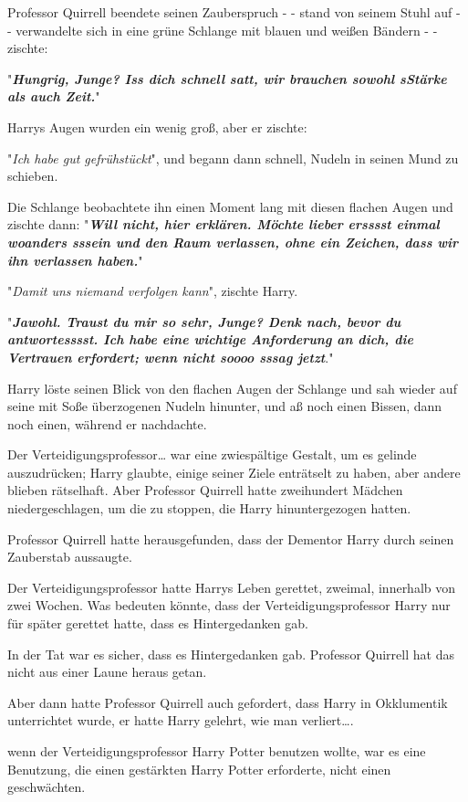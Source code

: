 {Professor Quirrell beendete seinen Zauberspruch - - stand von seinem Stuhl auf - - verwandelte sich in eine grüne Schlange mit blauen und weißen Bändern - - zischte:

"\textbf{\emph{Hungrig, Junge? Iss dich schnell satt, wir brauchen sowohl sStärke als auch Zeit.}}"

Harrys Augen wurden ein wenig groß, aber er zischte:

"\emph{Ich habe gut gefrühstückt}", und begann dann schnell, Nudeln in seinen Mund zu schieben.

Die Schlange beobachtete ihn einen Moment lang mit diesen flachen Augen und zischte dann: "\textbf{\emph{Will nicht, hier erklären. Möchte lieber ersssst einmal woanders sssein und den Raum verlassen, ohne ein Zeichen, dass wir ihn verlassen haben.}}"

"\emph{Damit uns niemand verfolgen kann}", zischte Harry.

"\textbf{\emph{Jawohl. Traust du mir so sehr, Junge? Denk nach, bevor du antwortesssst. Ich habe eine wichtige Anforderung an dich, die Vertrauen erfordert; wenn nicht soooo sssag jetzt}}."

Harry löste seinen Blick von den flachen Augen der Schlange und sah wieder auf seine mit Soße überzogenen Nudeln hinunter, und aß noch einen Bissen, dann noch einen, während er nachdachte.

Der Verteidigungsprofessor… war eine zwiespältige Gestalt, um es gelinde auszudrücken; Harry glaubte, einige seiner Ziele enträtselt zu haben, aber andere blieben rätselhaft. Aber Professor Quirrell hatte zweihundert Mädchen niedergeschlagen, um die zu stoppen, die Harry hinuntergezogen hatten.

Professor Quirrell hatte herausgefunden, dass der Dementor Harry durch seinen Zauberstab aussaugte.

Der Verteidigungsprofessor hatte Harrys Leben gerettet, zweimal, innerhalb von zwei Wochen. Was bedeuten könnte, dass der Verteidigungsprofessor Harry nur für später gerettet hatte, dass es Hintergedanken gab.

In der Tat war es sicher, dass es Hintergedanken gab. Professor Quirrell hat das nicht aus einer Laune heraus getan.

Aber dann hatte Professor Quirrell auch gefordert, dass Harry in Okklumentik unterrichtet wurde, er hatte Harry gelehrt, wie man verliert….

wenn der Verteidigungsprofessor Harry Potter benutzen wollte, war es eine Benutzung, die einen gestärkten Harry Potter erforderte, nicht einen geschwächten.

}
